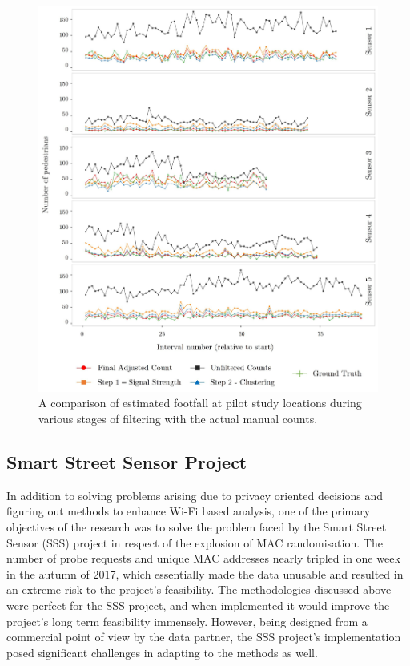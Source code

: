 \begin{figure}
  \includegraphics[trim=6 6 6 6, clip]{images/processing-pilot-results.jpg}
  \caption{A comparison of estimated footfall at pilot study locations during various stages of filtering with the actual manual counts.}
  \label{figure:processing:pilot:final}
\end{figure}

\subsection{Smart Street Sensor Project}
In addition to solving problems arising due to privacy oriented decisions and figuring out methods to enhance Wi-Fi based analysis, one of the primary objectives of the research was to solve the problem faced by the Smart Street Sensor (SSS) project in respect of the explosion of MAC randomisation.
The number of probe requests and unique MAC addresses nearly tripled in one week in the autumn of 2017, which essentially made the data unusable and resulted in an extreme risk to the project’s feasibility.
The methodologies discussed above were perfect for the SSS project, and when implemented it would improve the project’s long term feasibility immensely.
However, being designed from a commercial point of view by the data partner, the SSS project’s implementation posed significant challenges in adapting to the methods as well.

